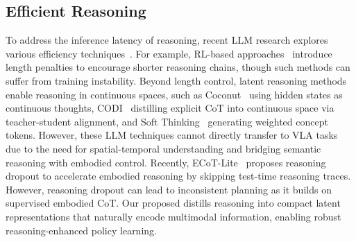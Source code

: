\subsection{Efficient Reasoning}

To address the inference latency of reasoning, recent LLM research explores various efficiency techniques~\cite{lee2025vlsi,dai2025stable,yuan2025efficient,xiang2025just,aggarwal2025l1,lee2025unified}. For example, RL-based approaches~\cite{dai2025stable,yuan2025efficient,xiang2025just,aggarwal2025l1} introduce length penalties to encourage shorter reasoning chains, though such methods can suffer from training instability. Beyond length control, latent reasoning methods~\cite{hao2024training,shen2025codi,zhang2025soft,cheng2024compressed,xu2025softcot} enable reasoning in continuous spaces, such as Coconut~\cite{hao2024training} using hidden states as continuous thoughts, CODI~\cite{shen2025codi} distilling explicit CoT into continuous space via teacher-student alignment, and Soft Thinking~\cite{zhang2025soft} generating weighted concept tokens. However, these LLM techniques cannot directly transfer to VLA tasks due to the need for spatial-temporal understanding and bridging semantic reasoning with embodied control.
Recently, ECoT-Lite~\cite{chen2025training} proposes reasoning dropout to accelerate embodied reasoning by skipping test-time reasoning traces. However, reasoning dropout can lead to inconsistent planning as it builds on supervised embodied CoT. Our proposed \ours{} distills reasoning into compact latent representations that naturally encode multimodal information, enabling robust reasoning-enhanced policy learning.